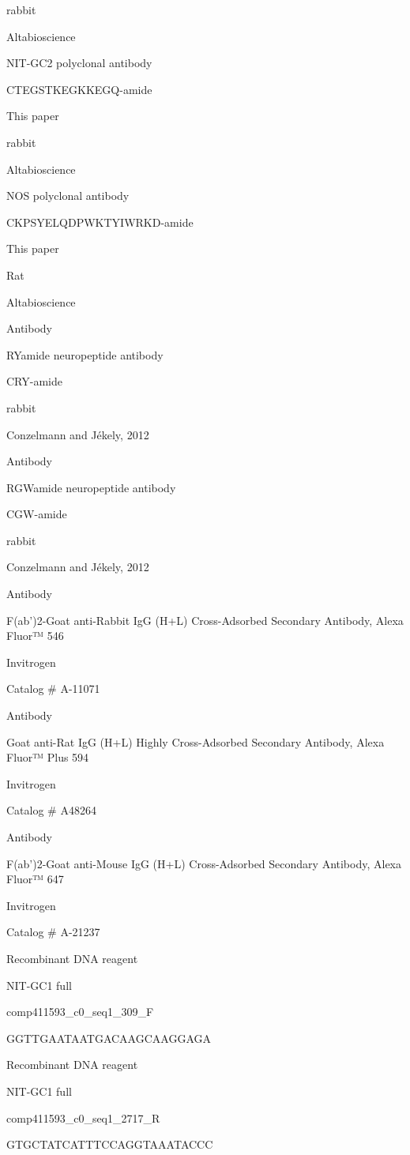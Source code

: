 \documentclass[
  10pt,
  onecolumn]{article}
\begin{document}
rabbit

Altabioscience

NIT-GC2 polyclonal antibody

CTEGSTKEGKKEGQ-amide

This paper

rabbit

Altabioscience

NOS polyclonal antibody

CKPSYELQDPWKTYIWRKD-amide

This paper

Rat

Altabioscience

Antibody

RYamide neuropeptide antibody

CRY-amide

rabbit

Conzelmann and Jékely, 2012

Antibody

RGWamide neuropeptide antibody

CGW-amide

rabbit

Conzelmann and Jékely, 2012

Antibody

F(ab')2-Goat anti-Rabbit IgG (H+L) Cross-Adsorbed Secondary Antibody,
Alexa Fluor™ 546

Invitrogen

Catalog \# A-11071

Antibody

Goat anti-Rat IgG (H+L) Highly Cross-Adsorbed Secondary Antibody, Alexa
Fluor™ Plus 594

Invitrogen

Catalog \# A48264

Antibody

F(ab')2-Goat anti-Mouse IgG (H+L) Cross-Adsorbed Secondary Antibody,
Alexa Fluor™ 647

Invitrogen

Catalog \# A-21237

Recombinant DNA reagent

NIT-GC1 full

comp411593\_c0\_seq1\_309\_F

GGTTGAATAATGACAAGCAAGGAGA

Recombinant DNA reagent

NIT-GC1 full

comp411593\_c0\_seq1\_2717\_R

GTGCTATCATTTCCAGGTAAATACCC
\end{document}
